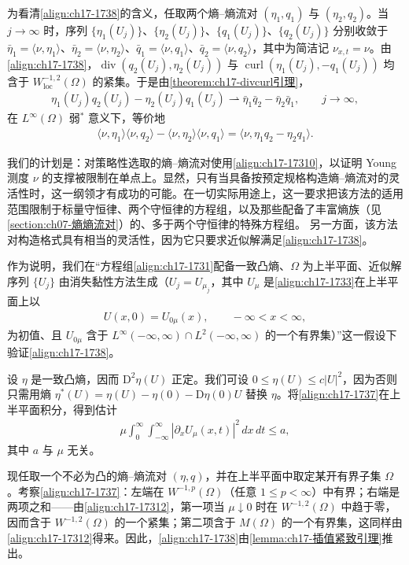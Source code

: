 \documentclass[../../main.tex]{subfiles}
\begin{document}
为看清\eqref{align:ch17-1738}的含义，任取两个熵--熵流对 $(\eta_1,q_1)$ 与 $(\eta_2,q_2)$。当 $j\to\infty$ 时，序列 $\{\eta_1(U_j)\}$、$\{\eta_2(U_j)\}$、$\{q_1(U_j)\}$、$\{q_2(U_j)\}$ 分别收敛于 $\bar\eta_1=\langle\nu,\eta_1\rangle$、$\bar\eta_2=\langle\nu,\eta_2\rangle$、$\bar q_1=\langle\nu,q_1\rangle$、$\bar q_2=\langle\nu,q_2\rangle$，其中为简洁记 $\nu_{x,t}=\nu$。由\eqref{align:ch17-1738}，$\operatorname{div}(q_2(U_j),\eta_2(U_j))$ 与 $\operatorname{curl}(\eta_1(U_j),-q_1(U_j))$ 均含于 $W^{-1,2}_{\mathrm{loc}}(\Omega)$ 的紧集。于是由\cref{theorem:ch17-divcurl引理}，
\begin{align}
\eta_1(U_j)q_2(U_j)-\eta_2(U_j)q_1(U_j)\rightharpoonup\bar\eta_1\bar q_2-\bar\eta_2\bar q_1,\qquad j\to\infty,
\label{align:ch17-1739}
\end{align}
在 $L^\infty(\Omega)$ 弱$^*$ 意义下，等价地
\begin{align}
\langle\nu,\eta_1\rangle\langle\nu,q_2\rangle-\langle\nu,\eta_2\rangle\langle\nu,q_1\rangle=\langle\nu,\eta_1q_2-\eta_2q_1\rangle.
\label{align:ch17-17310}
\end{align}

我们的计划是：对策略性选取的熵--熵流对使用\eqref{align:ch17-17310}，以证明 Young 测度 $\nu$ 的支撑被限制在单点上。显然，只有当具备按预定规格构造熵--熵流对的灵活性时，这一纲领才有成功的可能。在一切实际用途上，这一要求把该方法的适用范围限制于标量守恒律、两个守恒律的方程组，以及那些配备了丰富熵族（见\cref{section:ch07-熵熵流对}）的、多于两个守恒律的特殊方程组。
另一方面，该方法对构造格式具有相当的灵活性，因为它只要求近似解满足\eqref{align:ch17-1738}。

作为说明，我们在“方程组\eqref{align:ch17-1731}配备一致凸熵、$\Omega$ 为上半平面、近似解序列 $\{U_j\}$ 由消失黏性方法生成（$U_j=U_{\mu_j}$，其中 $U_\mu$ 是\eqref{align:ch17-1733}在上半平面上以
\begin{align}
U(x,0)=U_{0\mu}(x),\qquad-\infty<x<\infty,
\label{align:ch17-17311}
\end{align}
为初值、且 $U_{0\mu}$ 含于 $L^\infty(-\infty,\infty)\cap L^2(-\infty,\infty)$ 的一个有界集）”这一假设下验证\eqref{align:ch17-1738}。

设 $\eta$ 是一致凸熵，因而 $\mathrm{D}^2\eta(U)$ 正定。我们可设 $0\leqslant\eta(U)\leqslant c|U|^2$，因为否则只需用熵 $\eta^*(U)=\eta(U)-\eta(0)-\mathrm{D}\eta(0)U$ 替换 $\eta$。将\eqref{align:ch17-1737}在上半平面积分，得到估计
\begin{align}
\mu\int_0^\infty\int_{-\infty}^\infty|\partial_xU_\mu(x,t)|^2\,dx\,dt\leqslant a,
\label{align:ch17-17312}
\end{align}
其中 $a$ 与 $\mu$ 无关。

现任取一个不必为凸的熵--熵流对 $(\eta,q)$，并在上半平面中取定某开有界子集 $\Omega$。考察\eqref{align:ch17-1737}：左端在 $W^{-1,p}(\Omega)$（任意 $1\leqslant p<\infty$）中有界；右端是两项之和——由\eqref{align:ch17-17312}，第一项当 $\mu\downarrow0$ 时在 $W^{-1,2}(\Omega)$ 中趋于零，因而含于 $W^{-1,2}(\Omega)$ 的一个紧集；第二项含于 $M(\Omega)$ 的一个有界集，这同样由\eqref{align:ch17-17312}得来。因此，\eqref{align:ch17-1738}由\cref{lemma:ch17-插值紧致引理}推出。
\end{document}
